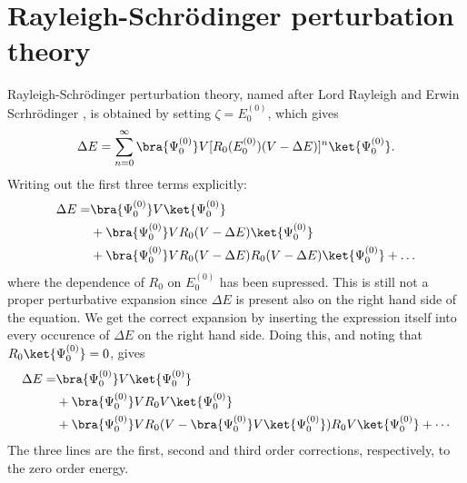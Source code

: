 \section{Rayleigh-Schrödinger perturbation theory}
Rayleigh-Schrödinger perturbation theory, named after Lord Rayleigh \cite{rayleigh} and Erwin Scrhrödinger \cite{schrodinger},
is obtained by setting $\zeta = E^{(0)}_0$, which gives
\begin{equation}
 \Delta E = \sum_{n=0}^\infty \bra{\Psi^{(0)}_0}V[R_0(E^{(0)}_0)(V - \Delta E)]^n \ket{\Psi^{(0)}_0}.
\end{equation}
Writing out the first three terms explicitly:
\begin{equation}
 \begin{split}
  \Delta E = & \bra{\Psi^{(0)}_0}V\ket{\Psi^{(0)}_0} \\
             & + \bra{\Psi^{(0)}_0}V R_0(V - \Delta E) \ket{\Psi^{(0)}_0} \\
             & + \bra{\Psi^{(0)}_0}V R_0(V - \Delta E)R_0(V - \Delta E) \ket{\Psi^{(0)}_0} + \dots
 \end{split}
\end{equation}
where the dependence of $R_0$ on $E^{(0)}_0$ has been supressed.
This is still not a proper perturbative expansion since $\Delta E$ is present also on the right hand side of the equation. We get the correct expansion
by inserting the expression itself into every occurence of $\Delta E$ on the right hand side. Doing this, and noting that $R_0\ket{\Psi^{(0)}_0} = 0$, gives
\begin{equation}
 \begin{split}
  \Delta E = & \bra{\Psi^{(0)}_0}V\ket{\Psi^{(0)}_0} \\
             & + \bra{\Psi^{(0)}_0}V R_0 V\ket{\Psi^{(0)}_0} \\
             & + \bra{\Psi^{(0)}_0}V R_0(V - \bra{\Psi^{(0)}_0}V\ket{\Psi^{(0)}_0})R_0 V\ket{\Psi^{(0)}_0} + \cdots
 \end{split}
\end{equation}
The three lines are the first, second and third order corrections, respectively, to the zero order energy.





